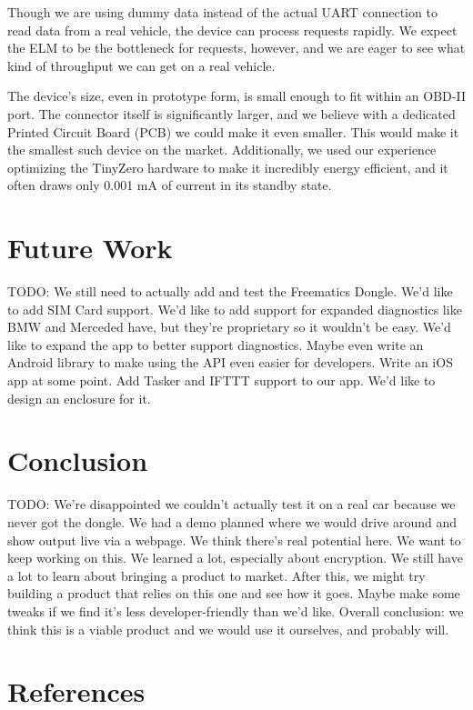 \documentclass[10pt,letterpaper,unboxed,cm]{article}
\newcommand{\todo}{\color{red} TODO: \color{black}}
\begin{document}
Though we are using dummy data instead of the actual UART connection to read data from a real vehicle, the device can process requests rapidly. We expect the ELM to be the bottleneck for requests, however, and we are eager to see what kind of throughput we can get on a real vehicle.

The device's size, even in prototype form, is small enough to fit within an OBD-II port. The connector itself is significantly larger, and we believe with a dedicated Printed Circuit Board (PCB) we could make it even smaller. This would make it the smallest such device on the market. Additionally, we used our experience optimizing the TinyZero hardware to make it incredibly energy efficient, and it often draws only 0.001 mA of current in its standby state.

\section{Future Work}

\todo We still need to actually add and test the Freematics Dongle. We'd like to add SIM Card support. We'd like to add support for expanded diagnostics like BMW and Merceded have, but they're proprietary so it wouldn't be easy. We'd like to expand the app to better support diagnostics. Maybe even write an Android library to make using the API even easier for developers. Write an iOS app at some point. Add Tasker and IFTTT support to our app. We'd like to design an enclosure for it.

\section{Conclusion}

\todo We're disappointed we couldn't actually test it on a real car because we never got the dongle. We had a demo planned where we would drive around and show output live via a webpage. We think there's real potential here. We want to keep working on this. We learned a lot, especially about encryption. We still have a lot to learn about bringing a product to market. After this, we might try building a product that relies on this one and see how it goes. Maybe make some tweaks if we find it's less developer-friendly than we'd like. Overall conclusion: we think this is a viable product and we would use it ourselves, and probably will.

\section{References}


\end{document}
